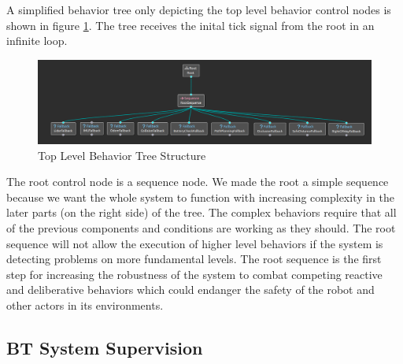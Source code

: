 A simplified behavior tree only depicting the top level behavior control nodes is shown in figure \ref{fig:top_level_bt}. The tree receives the inital tick signal from the root in an infinite loop. 
\begin{figure}[ht]
	\label{fig:top_level_bt}
	\includegraphics[width=1.0\textwidth]{images/simplified_bt.png}
	\caption{Top Level Behavior Tree Structure}
\end{figure}
The root control node is a sequence node. We made the root a simple sequence because we want the whole system to function with increasing complexity in the later parts (on the right side) of the tree. The complex behaviors require that all of the previous components and conditions are working as they should. The root sequence will not allow the execution of higher level behaviors if the system is detecting problems on more fundamental levels. The root sequence is the first step for increasing the robustness of the system to combat competing reactive and deliberative behaviors which could endanger the safety of the robot and other actors in its environments. 



\subsection{BT System Supervision}

